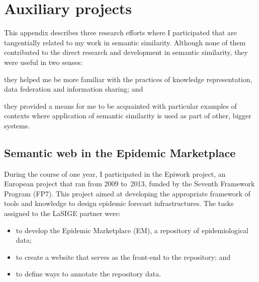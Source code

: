\chapter{Auxiliary projects} \label{app:auxiliary-projects}

This appendix describes three research efforts where I participated that are tangentially related to my work in semantic similarity. Although none of them contributed to the direct research and development in semantic similarity, they were useful in two senses:
\begin{paralist}
    \item they helped me be more familiar with the practices of knowledge representation, data federation and information sharing; and
    \item they provided a means for me to be acquainted with particular examples of contexts where application of semantic similarity is used as part of other, bigger systems.
\end{paralist}


\section{Semantic web in the Epidemic Marketplace}
\label{sec:auxiliary-projects/epiwork}

During the course of one year, I participated in the Epiwork project, an European project that ran from 2009 to~2013, funded by the Seventh Framework Program (FP7). This project aimed at developing the appropriate framework of tools and knowledge to design epidemic forecast infrastructures. The tasks assigned to the LaSIGE partner were:
\begin{itemize}
    \item to develop the Epidemic Marketplace (EM), a repository of epidemiological data;
    \item to create a website that serves as the front-end to the repository; and
    \item to define ways to annotate the repository data.
\end{itemize}

